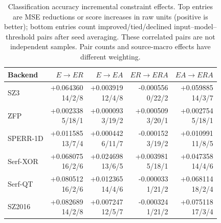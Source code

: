 \begin{table}[t]
\centering
\small
\setlength{\tabcolsep}{5pt}
\caption{Classification accuracy incremental constraint effects. Top entries are MSE reductions or score increases in raw units (positive is better); bottom entries count improved/tied/declined input--model--threshold pairs after seed averaging. These correlated pairs are not independent samples. Pair counts and source-macro effects have different weighting.}
\label{tab:s-ablation-contrast-classification-accuracy}
\begin{tabular}{@{}lrrrr@{}}
\toprule
Backend & $E\to ER$ & $E\to EA$ & $ER\to ERA$ & $EA\to ERA$ \\
\midrule
SZ3 & \shortstack[r]{+0.064360\\14/2/8} & \shortstack[r]{+0.003919\\12/4/8} & \shortstack[r]{-0.000556\\0/22/2} & \shortstack[r]{+0.059885\\14/3/7} \\
ZFP & \shortstack[r]{+0.002338\\5/18/1} & \shortstack[r]{+0.000093\\3/19/2} & \shortstack[r]{+0.000509\\3/20/1} & \shortstack[r]{+0.002754\\5/18/1} \\
SPERR-1D & \shortstack[r]{+0.011585\\13/7/4} & \shortstack[r]{+0.000442\\6/11/7} & \shortstack[r]{-0.000152\\3/19/2} & \shortstack[r]{+0.010991\\11/8/5} \\
Serf-XOR & \shortstack[r]{+0.068075\\16/2/6} & \shortstack[r]{+0.024698\\13/6/5} & \shortstack[r]{+0.003981\\5/18/1} & \shortstack[r]{+0.047358\\14/4/6} \\
Serf-QT & \shortstack[r]{+0.080512\\16/2/6} & \shortstack[r]{+0.012365\\14/4/6} & \shortstack[r]{-0.000033\\1/21/2} & \shortstack[r]{+0.068114\\18/2/4} \\
SZ2016 & \shortstack[r]{+0.082689\\14/2/8} & \shortstack[r]{+0.007247\\12/5/7} & \shortstack[r]{-0.000324\\1/21/2} & \shortstack[r]{+0.075118\\17/3/4} \\
\bottomrule
\end{tabular}
\end{table}

